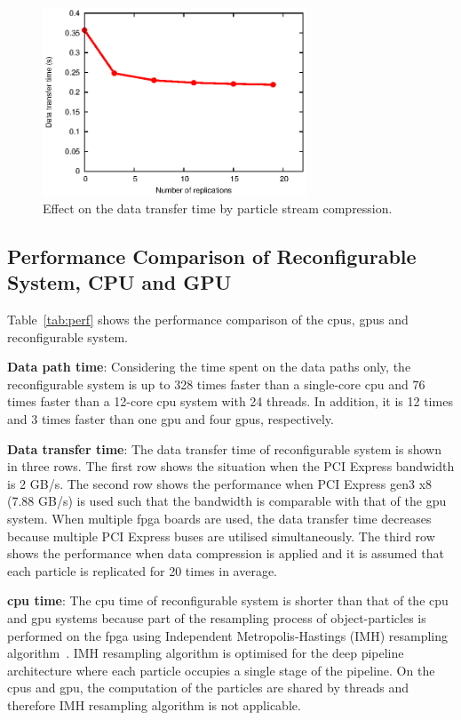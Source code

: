 \begin{figure}[t!]
\centering
\includegraphics[width=0.7\textwidth]{4_adaptation/figures/fig_compression}
\caption{Effect on the data transfer time by particle stream compression.}
\label{fig:compression}
\end{figure}

\subsection{Performance Comparison of Reconfigurable System, CPU and GPU}
Table~\ref{tab:perf} shows the performance comparison of the \glspl{cpu}, \gls{gpu}s and reconfigurable system.

\textbf{Data path time}: Considering the time spent on the data paths only, the reconfigurable system is up to 328 times faster than a single-core \gls{cpu} and 76 times faster than a 12-core \gls{cpu} system with 24 threads.
In addition, it is 12 times and 3 times faster than one \gls{gpu} and four \gls{gpu}s, respectively.

\textbf{Data transfer time}: The data transfer time of reconfigurable system is shown in three rows.
The first row shows the situation when the PCI Express bandwidth is 2 GB/s.
The second row shows the performance when PCI Express gen3 x8 (7.88 GB/s) is used such that the bandwidth is comparable with that of the \gls{gpu} system.
When multiple \gls{fpga} boards are used, the data transfer time decreases because multiple PCI Express buses are utilised simultaneously.
The third row shows the performance when data compression is applied and it is assumed that each particle is replicated for 20 times in average.

\textbf{\gls{cpu} time}: The \gls{cpu} time of reconfigurable system is shorter than that of the \gls{cpu} and \gls{gpu} systems because part of the resampling process of object-particles is performed on the \gls{fpga} using Independent Metropolis-Hastings (IMH) resampling algorithm~\cite{miao11}.
IMH resampling algorithm is optimised for the deep pipeline architecture where each particle occupies a single stage of the pipeline.
On the \glspl{cpu} and \gls{gpu}, the computation of the particles are shared by threads and therefore IMH resampling algorithm is not applicable.

